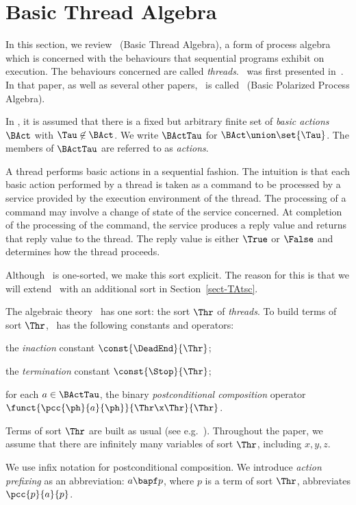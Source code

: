 \documentclass[fleqn]{llncs}
\begin{document}
\section{Basic Thread Algebra}
\label{sect-BTA}

In this section, we review \BTA\ (Basic Thread Algebra), a form of
process algebra which is concerned with the behaviours that sequential
programs exhibit on execution.
The behaviours concerned are called \emph{threads}.
\BTA\ was first presented in~\cite{BL02a}.
In that paper, as well as several other papers, \BTA\ is called \BPPA\
(Basic Polarized Process Algebra).

In \BTA, it is assumed that there is a fixed but arbitrary finite set of
\emph{basic actions} $\BAct$ with $\Tau \not\in \BAct$.
We write $\BActTau$ for $\BAct \union \set{\Tau}$.
The members of $\BActTau$ are referred to as \emph{actions}.

A thread performs basic actions in a sequential fashion.
The intuition is that each basic action performed by a thread is taken
as a command to be processed by a service provided by the execution
environment of the thread.
The processing of a command may involve a change of state of the service
concerned.
At completion of the processing of the command, the service produces a
reply value and returns that reply value to the thread.
The reply value is either $\True$ or $\False$ and determines how the
thread proceeds.

Although \BTA\ is one-sorted, we make this sort explicit.
The reason for this is that we will extend \BTA\ with an additional sort
in Section~\ref{sect-TAtsc}.

The algebraic theory \BTA\ has one sort: the sort $\Thr$ of
\emph{threads}.
To build terms of sort $\Thr$, \BTA\ has the following constants and
operators:
\begin{iteml}
\item
the \emph{inaction} constant $\const{\DeadEnd}{\Thr}$;
\item
the \emph{termination} constant $\const{\Stop}{\Thr}$;
\item
for each $a \in \BActTau$, the binary \emph{postconditional composition}
operator $\funct{\pcc{\ph}{a}{\ph}}{\Thr \x \Thr}{\Thr}$.
\end{iteml}
Terms of sort $\Thr$ are built as usual (see e.g.~\cite{ST99a,Wir90a}).
Throughout the paper, we assume that there are infinitely many variables
of sort $\Thr$, including $x,y,z$.

We use infix notation for postconditional composition.
We introduce \emph{action prefixing} as an abbreviation: $a \bapf p$,
where $p$ is a term of sort $\Thr$, abbreviates $\pcc{p}{a}{p}$.
\end{document}
